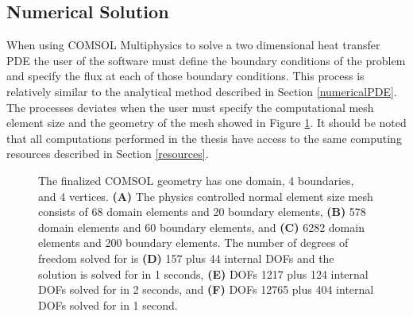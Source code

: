 \subsection{Numerical Solution}\label{numericalSolution}

\par When using COMSOL Multiphysics to solve a two dimensional heat transfer PDE the user of the software must define the boundary conditions of the problem and specify the flux at each of those boundary conditions. This process is relatively similar to the analytical method described in Section \ref{numericalPDE}. The processes deviates when the user must specify the computational mesh element size and the geometry of the mesh showed in Figure \ref{fig:discreteSolution}. It should be noted that all computations performed in the thesis have access to the same computing resources described in Section \ref{resources}.

\begin{figure}[h]
\centering{}
\caption{The finalized COMSOL geometry has one domain, 4 boundaries, and 4 vertices. \textbf{(A)} The physics controlled normal element size mesh consists of 68 domain elements and 20 boundary elements, \textbf{(B)} 578 domain elements and 60 boundary elements, and  \textbf{(C)} 6282 domain elements and 200 boundary elements. The number of degrees of freedom solved for is \textbf{(D)} 157 plus 44 internal DOFs and the solution is solved for in 1 seconds, \textbf{(E)} DOFs 1217 plus 124 internal DOFs solved for in 2 seconds, and \textbf{(F)} DOFs 12765 plus 404 internal DOFs solved for in 1 second.}
\label{fig:discreteSolution}
\end{figure}

